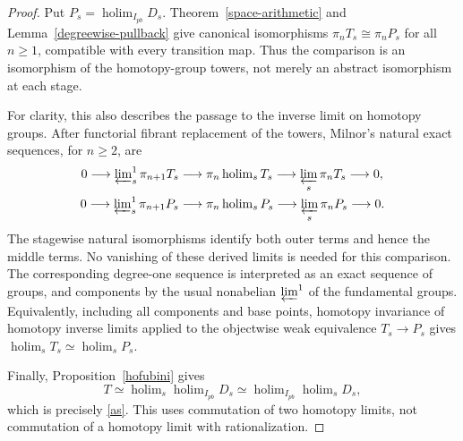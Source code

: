 \documentclass[10pt,a4paper]{amsart}
\begin{document}
\begin{proof}
Put $P_s=\operatorname{holim}_{I_{pb}}D_s$.
Theorem~\ref{space-arithmetic} and
Lemma~\ref{degreewise-pullback} give canonical isomorphisms
$\pi_nT_s\cong\pi_nP_s$ for all $n\geq1$, compatible with every
transition map.  Thus the comparison is an isomorphism of the
homotopy-group towers, not merely an abstract isomorphism at each
stage.

For clarity, this also describes the passage to the inverse limit
on homotopy groups.  After functorial fibrant replacement of the
towers, Milnor's natural exact sequences, for $n\geq2$, are
\[
\begin{split}
0\longrightarrow\varprojlim\nolimits_s^1\pi_{n+1}T_s
&\longrightarrow\pi_n\operatorname{holim}_sT_s
\longrightarrow\varprojlim_s\pi_nT_s\longrightarrow0,\\
0\longrightarrow\varprojlim\nolimits_s^1\pi_{n+1}P_s
&\longrightarrow\pi_n\operatorname{holim}_sP_s
\longrightarrow\varprojlim_s\pi_nP_s\longrightarrow0.
\end{split}
\]
The stagewise natural isomorphisms identify both outer terms and
hence the middle terms.  No vanishing of these derived limits is
needed for this comparison.  The corresponding degree-one sequence
is interpreted as an exact sequence of groups, and components by
the usual nonabelian $\varprojlim^1$ of the fundamental groups.
Equivalently, including all components and base points, homotopy
invariance of homotopy inverse limits applied to the objectwise
weak equivalence $T_s\to P_s$ gives
$\operatorname{holim}_sT_s\simeq\operatorname{holim}_sP_s$.

Finally, Proposition~\ref{hofubini} gives
\[
 T\simeq\operatorname{holim}_s\operatorname{holim}_{I_{pb}}D_s
 \simeq\operatorname{holim}_{I_{pb}}\operatorname{holim}_sD_s,
\]
which is precisely \eqref{as}.  This uses commutation of two homotopy
limits, not commutation of a homotopy limit with rationalization.
\end{proof}
\end{document}

